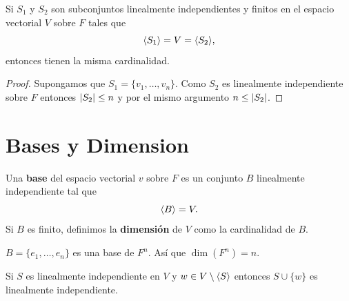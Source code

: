\documentclass[12pt,a4paper]{book}
\begin{document}
    \begin{corolario}
        Si $S_{1}$ y $S_{2}$ son subconjuntos linealmente independientes y finitos en el espacio
        vectorial $V$ sobre $F$ tales que
        \begin{equation*}
            \langle S_{1} \rangle=V=\langle S_{2} \rangle,
        \end{equation*}
        entonces tienen la misma cardinalidad.
    \end{corolario}

    \begin{proof}
        Supongamos que $S_{1}=\{v_{1},\dots,v_{n}\}$. Como $S_{2}$ es linealmente independiente
        sobre $F$ entonces $\abs{S_{2}}\leq n$ y por el mismo argumento $n\leq\abs{S_{2}}$.
    \end{proof}

    \section{Bases y Dimension}

    \begin{definicion}
        Una \textbf{base} del espacio vectorial $v$ sobre $F$ es un conjunto $B$ linealmente independiente
        tal que
        \begin{equation*}
            \langle B \rangle=V.
        \end{equation*}
        Si $B$ es finito, definimos la \textbf{dimensión} de $V$ como la cardinalidad de
        $B$.
    \end{definicion}

    \begin{ejemplo}
        $B=\{e_{1},\dots,e_{n}\}$ es una base de $F^{n}$. Así que $\dim(F^{n})=n$.
    \end{ejemplo}

    \begin{lema}
        Si $S$ es linealmente independiente en $V$ y $w\in V\setminus\langle S \rangle$ entonces
        $S\cup\{w\}$ es linealmente independiente.
    \end{lema}
\end{document}
